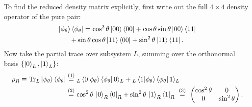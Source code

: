 To find the reduced density matrix explicitly, first write out the full $4\times4$ density operator of the
pure pair:
\begin{multline*}
\ket{\phi_\theta}\bra{\phi_\theta} = \cos^2\theta\ket{00}\bra{00} + \cos\theta\sin\theta\ket{00}\bra{11} \\
+ \sin\theta\cos\theta\ket{11}\bra{00} + \sin^2\theta\ket{11}\bra{11} .
\end{multline*}
Now take the partial trace over subsystem $L$, summing over the orthonormal basis $\{\ket0_L, \ket1_L\}$:
\begin{align}
\rho_R \equiv \operatorname{Tr}_L\ket{\phi_\theta}\bra{\phi_\theta}
&\overset{(1)}{=} {}_L\braket{0|\phi_\theta}\bra{\phi_\theta}0\rangle_L + {}_L\braket{1|\phi_\theta}\bra{\phi_\theta}1\rangle_L \notag\\
&\overset{(2)}{=} \cos^2\theta\,\ket0_R\bra0_R + \sin^2\theta\,\ket1_R\bra1_R
\ \overset{(3)}{=}\ \begin{pmatrix} \cos^2\theta & 0 \\ 0 & \sin^2\theta \end{pmatrix} . \notag
\end{align}
\quad
{}\quad
{}

